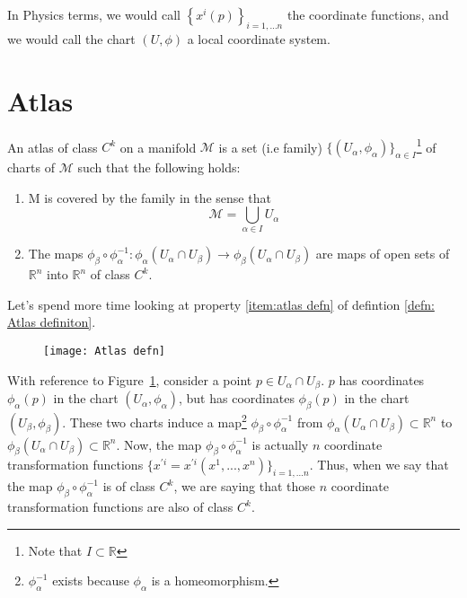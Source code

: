     In Physics terms, we would call $\left\{x^i(p)\right\}_{i = 1,...n}$
    the coordinate functions, and we would call the chart $(U, \phi)$ a
    local coordinate system.
  \section{Atlas}
    \begin{definition}[Atlas]
      \label{defn: Atlas definiton}
      An atlas of class $C^k$ on a manifold $\mathcal{M}$ is a set (i.e
      family) $\{(U_\alpha,\phi_\alpha)\}_{\alpha \in I}$\footnote{Note
      that $I\subset \mathbb{R}$} of charts of $\mathcal{M}$ such that the
      following holds:
      \begin{enumerate}
        \item{M is covered by the family in the sense that
          \begin{equation*}
            \mathcal{M} = \bigcup_{\alpha\in I} U_\alpha
          \end{equation*}}
        \item{\label{item:atlas defn}The maps $\phi_\beta \circ
        \phi_\alpha^{-1}: \phi_\alpha(U_\alpha \cap U_\beta) \rightarrow
        \phi_\beta(U_\alpha \cap U_\beta)$ are maps of open sets of
        $\mathbb{R}^n$ into $\mathbb{R}^n$ of class $C^k$.}
      \end{enumerate}
    \end{definition}
      Let's spend more time looking at property \ref{item:atlas defn} of
      defintion \ref{defn: Atlas definiton}.
      \begin{figure}[ht]
        \centering
        \texttt{[image: Atlas defn]}
        \caption[]{}
        \label{fig:atlas defn}
      \end{figure}
      With reference to Figure~\ref{fig:atlas defn}, consider a point $p
      \in U_\alpha \cap U_\beta$. $p$ has coordinates $\phi_\alpha(p)$ in
      the chart $(U_\alpha,\phi_\alpha)$, but has coordinates
      $\phi_\beta(p)$ in the chart $(U_\beta,\phi_\beta)$. These two charts
      induce a map\footnote{$\phi_\alpha^{-1}$ exists because $\phi_\alpha$ is a homeomorphism.} $\phi_\beta \circ \phi_\alpha^{-1}$ from
      $\phi_\alpha(U_\alpha \cap U_\beta) \subset \mathbb{R}^n$ to
      $\phi_\beta(U_\alpha \cap U_\beta) \subset \mathbb{R}^n$. Now, the
      map $\phi_\beta \circ \phi_\alpha^{-1}$ is actually $n$ coordinate
      transformation functions $\{x^{\prime i} = x^{\prime
      i}(x^1,...,x^n)\}_{i=1,...n}$. Thus, when we say that the map
      $\phi_\beta \circ \phi_\alpha^{-1}$ is of class $C^k$, we are saying
      that those $n$ coordinate transformation functions are also of class
      $C^k$.

